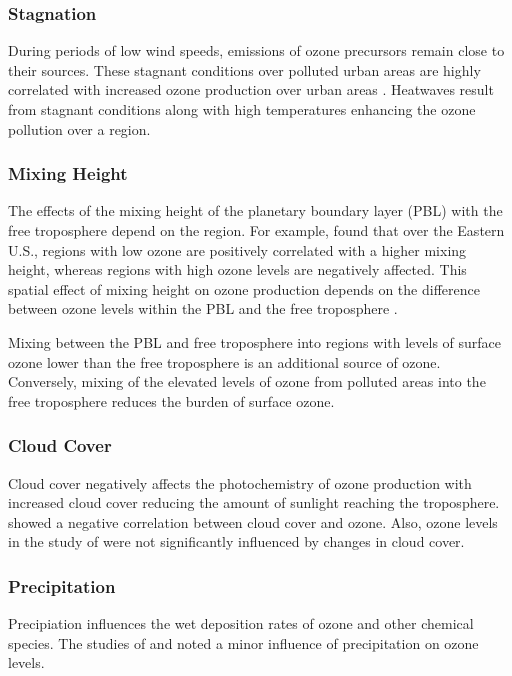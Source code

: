 \subsubsection{Stagnation}
During periods of low wind speeds, emissions of ozone precursors remain close to their sources.
These stagnant conditions over polluted urban areas are highly correlated with increased ozone production over urban areas \citep{Jacob:2009}.
Heatwaves result from stagnant conditions along with high temperatures enhancing the ozone pollution over a region.

\newpage
\vspace{-4mm}
\subsubsection{Mixing Height}
The effects of the mixing height of the planetary boundary layer (PBL) with the free troposphere depend on the region.
For example, \citet{Dawson:2007} found that over the Eastern U.S., regions with low ozone are positively correlated with a higher mixing height, whereas regions with high ozone levels are negatively affected.
This spatial effect of mixing height on ozone production depends on the difference between ozone levels within the PBL and the free troposphere \citep{Jacob:2009}.

Mixing between the PBL and free troposphere into regions with levels of surface ozone lower than the free troposphere is an additional source of ozone.
Conversely, mixing of the elevated levels of ozone from polluted areas into the free troposphere reduces the burden of surface ozone.

\vspace{-4mm}
\subsubsection{Cloud Cover}
Cloud cover negatively affects the photochemistry of ozone production with increased cloud cover reducing the amount of sunlight reaching the troposphere.
\citet{Korsog:1991} showed a negative correlation between cloud cover and ozone.
Also, ozone levels in the study of \citet{Dawson:2007} were not significantly influenced by changes in cloud cover.

\vspace{-4mm}
\subsubsection{Precipitation}
Precipiation influences the wet deposition rates of ozone and other chemical species.
The studies of \citet{Dawson:2007} and \citet{Murazaki:2006} noted a minor influence of precipitation on ozone levels.

